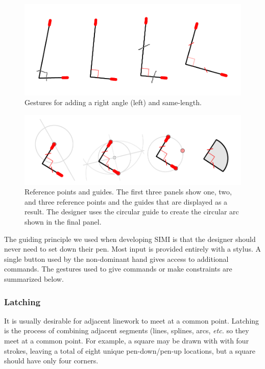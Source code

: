 \documentclass{article}
\begin{document}
\begin{figure}[h]
  \centering
  \includegraphics[width=0.9\linewidth]{img/constraints-all.pdf}
  \caption{Gestures for adding a right angle (left) and same-length.}
  \label{fig:constraints}
\end{figure}

\begin{figure}[h]
  \centering
  \includegraphics[width=0.9\linewidth]{img/guides-all.pdf}
  \caption{Reference points and guides. The first three panels show
    one, two, and three reference points and the guides that are
    displayed as a result. The designer uses the circular guide to
    create the circular arc shown in the final panel.}
  \label{fig:guides}
\end{figure}



The guiding principle we used when developing SIMI is that the
designer should never need to set down their pen. Most input is
provided entirely with a stylus. A single button used by the
non-dominant hand gives access to additional commands. The gestures
used to give commands or make constraints are summarized below.

\subsubsection{Latching}

It is usually desirable for adjacent linework to meet at a common
point. Latching is the process of combining adjacent segments (lines,
splines, arcs, \textit{etc.} so they meet at a common point. For
example, a square may be drawn with with four strokes, leaving a total
of eight unique pen-down/pen-up locations, but a square should have
only four corners.
\end{document}

